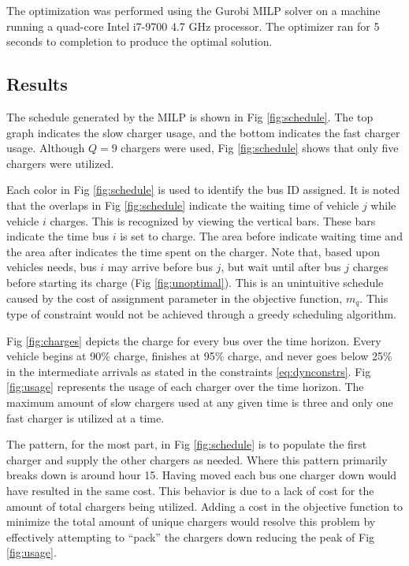 \documentclass[letterpaper, 10pt, conference]{IEEEtran}
\begin{document}
The optimization was performed using the Gurobi MILP solver \cite{Hespanha2018} on a machine running a quad-core Intel
i7-9700 4.7 GHz processor. The optimizer ran for 5 seconds to completion to produce the optimal solution.

\subsection{Results}
The schedule generated by the MILP is shown in Fig \ref{fig:schedule}. The top graph indicates the slow charger usage,
and the bottom indicates the fast charger usage. Although $Q = 9$ chargers were used, Fig \ref{fig:schedule} shows that
only five chargers were utilized.

Each color in Fig \ref{fig:schedule} is used to identify the bus ID assigned. It is noted that the overlaps in Fig
\ref{fig:schedule} indicate the waiting time of vehicle $j$ while vehicle $i$ charges. This is recognized by viewing the
vertical bars. These bars indicate the time bus $i$ is set to charge. The area before indicate waiting time and the area
after indicates the time spent on the charger. Note that, based upon vehicles needs, bus $i$ may arrive before bus $j$,
but wait until after bus $j$ charges before starting its charge (Fig \ref{fig:unoptimal}). This is an unintuitive
schedule caused by the cost of assignment parameter in the objective function, $m_q$. This type of constraint would not
be achieved through a greedy scheduling algorithm.

Fig \ref{fig:charges} depicts the charge for every bus over the time horizon. Every vehicle begins at 90\% charge,
finishes at 95\% charge, and never goes below 25\% in the intermediate arrivals as stated in the constraints
\eqref{eq:dynconstrs}. Fig \ref{fig:usage} represents the usage of each charger over the time horizon. The maximum
amount of slow chargers used at any given time is three and only one fast charger is utilized at a time.

The pattern, for the most part, in Fig \ref{fig:schedule} is to populate the first charger and supply the other chargers
as needed. Where this pattern primarily breaks down is around hour 15. Having moved each bus one charger down would have
resulted in the same cost. This behavior is due to a lack of cost for the amount of total chargers being utilized.
Adding a cost in the objective function to minimize the total amount of unique chargers would resolve this problem by
effectively attempting to ``pack'' the chargers down reducing the peak of Fig \ref{fig:usage}.
\end{document}
